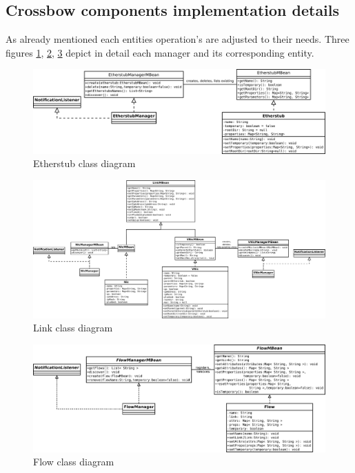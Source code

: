 \documentclass[11pt,openany]{book}
\begin{document}
      \subsection{Crossbow components implementation details}
      \label{sec:impl:comp}

        As already mentioned each entities operation's are adjusted to their needs. Three figures \ref{fig:impl:etherstub}, 
        \ref{fig:impl:vnic}, \ref{fig:impl:flow} depict in detail each manager and its corresponding entity.

        \begin{figure}[H]
          \centering
          \includegraphics[width=.85\textheight, angle=90]{img/impl/etherstub.pdf}

          \caption{Etherstub class diagram}
          \label{fig:impl:etherstub}
        \end{figure}

        \begin{figure}[H]
          \centering
          \includegraphics[width=.95\textheight, angle=90]{img/impl/link.pdf}

          \caption{Link class diagram}
          \label{fig:impl:vnic}
        \end{figure}

        \begin{figure}[H]
          \centering
          \includegraphics[width=.85\textheight, angle=90]{img/impl/flow.pdf}

          \caption{Flow class diagram}
          \label{fig:impl:flow}
        \end{figure}
\end{document}
